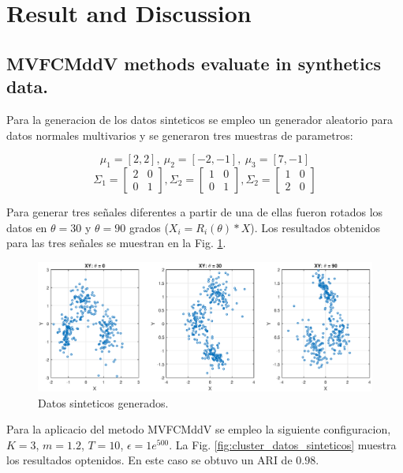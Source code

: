 \documentclass[12pt]{article}
\begin{document}
\section{Result and Discussion }


\subsection{MVFCMddV methods evaluate in synthetics data.}

Para la generacion de los datos sinteticos se empleo un generador aleatorio para datos normales multivarios y se generaron tres muestras de parametros: 

$$\mu_1 = [2, 2], \ \mu_2 = [-2, -1], \ \mu_3 = [7, -1] $$
$$\Sigma_1 = \left[ \begin{matrix}
2 & 0 \\ 
0 & 1
\end{matrix} \right], 
\Sigma_2 = \left[ \begin{matrix}
1 & 0 \\ 
0 & 1
\end{matrix} \right], 
\Sigma_2 = \left[ \begin{matrix}
1 & 0 \\ 
2 & 0
\end{matrix} \right] $$

Para generar tres señales diferentes a partir de una de ellas fueron rotados los datos en $\theta = 30$ y $\theta = 90$ grados ($X_i = R_i(\theta)*X$). Los resultados obtenidos para las tres señales se muestran en la Fig. \ref{fig:xy_sinteticos}.

\begin{figure}[h]
\centering
\includegraphics[width=4.5in]{../out/xy-sinteticos.eps}
\caption{Datos sinteticos generados.}
\label{fig:xy_sinteticos}
\end{figure}  

Para la aplicacio del metodo MVFCMddV se empleo la siguiente configuracion, $K = 3$, $m = 1.2$, $T = 10$, $\epsilon = 1e^{500}$. La Fig. \ref{fig:cluster_datos_sinteticos} muestra los resultados optenidos. En este caso se obtuvo un ARI de $0.98$.
\end{document}
